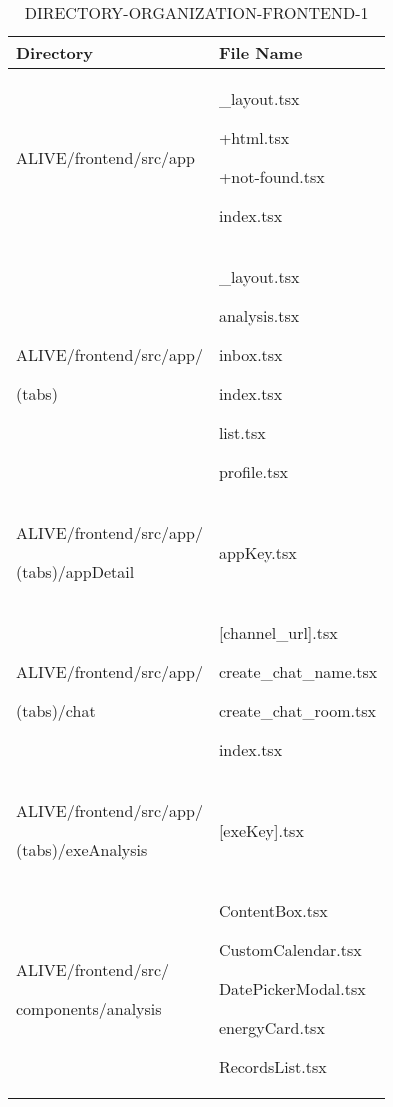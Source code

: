 \documentclass[conference]{IEEEtran}
\begin{document}
\begin{enumerate}
\begin{itemize}
\begin{itemize}
\begin{enumerate}
\begin{table}[h]
\caption{DIRECTORY-ORGANIZATION-FRONTEND-1}
\def\arraystretch{1.24} \small
    \begin{tabular}{|p{3.7cm}|p{4.1cm}|}
\hline
        Directory & File Name \\ \hline
          ALIVE/frontend/src/app  & \_layout.tsx \par +html.tsx \par +not-found.tsx \par index.tsx 
          \\ \hline
          
          ALIVE/frontend/src/app/ \par (tabs) \par  & \_layout.tsx \par analysis.tsx \par inbox.tsx \par index.tsx \par list.tsx \par profile.tsx
          \\ \hline
          
          ALIVE/frontend/src/app/ \par (tabs)/appDetail \par  & appKey.tsx
          \\ \hline
          
          ALIVE/frontend/src/app/ \par (tabs)/chat \par  & [channel\_url].tsx \par create\_chat\_name.tsx \par create\_chat\_room.tsx \par index.tsx
          \\ \hline
          
          ALIVE/frontend/src/app/ \par (tabs)/exeAnalysis \par  & [exeKey].tsx
          \\ \hline
          
          ALIVE/frontend/src/ \par components/analysis \par  & ContentBox.tsx \par CustomCalendar.tsx \par DatePickerModal.tsx \par energyCard.tsx \par RecordsList.tsx
          \\ \hline
          

\end{tabular}
\end{table}
\end{enumerate}
\end{itemize}
\end{itemize}
\end{enumerate}
\end{document}
